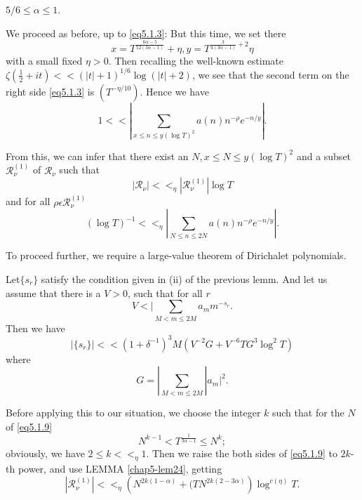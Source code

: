 \begin{Case}\label{chap5-case2}%
  $5/6 \leq \alpha \leq 1$.
\end{Case}

We proceed as before, up to \eqref{eq5.1.3}: But this time, we set
there  
\begin{equation*}
  x = T^{\frac{6 \alpha - 5 }{12(3 \alpha -1)}} + \eta,  y =
  T^{\frac{3 }{4 (3\alpha -1 )}+2}  \eta  \tag{5.1.7} \label{eq5.1.7}
\end{equation*}
with a small fixed $\eta > 0$. Then recalling the well-known estimate
$\zeta (\frac{1}{2} + it) << ( | t | + 1)^{1/6} \log ( | t | + 2)$, we
see that the second term on the right side \eqref{eq5.1.3} is $(T^{-
  \eta/10})$. Hence we have  
$$
1 << | \sum_{x \leq n \leq y (\log T)^2} a (n) n^{-\rho}e^{-n/y} |.
$$

From this, we can infer that there exist an $N, x \leq N \leq y (\log
T)^2$ and a subset $\mathscr{R}^{(1)}_{\nu}$ of $\mathscr{R}_{\nu}$
such that  
\begin{equation*}
  |\mathscr{R}_{\nu} | <<_{\eta} | \mathscr{R}^{(1)}_{\nu} | \log T
  \tag{5.1.8}\label{eq5.1.8} 
\end{equation*}
and for all $\rho \epsilon  \mathscr{R}^{(1)}_{\nu}$
\begin{equation*}
(\log T)^{-1} <<_{\eta} | \sum_{ N \leq n \leq 2N} a (n)
  n^{-\rho}e^{-n/y} |.  \tag{5.1.9} \label{eq5.1.9}
\end{equation*}

To proceed further, we require a large-value theorem of Dirichalet
polynomials. 

\begin{Lemma}\label{chap5-lem24}%
Let\pageoriginale $\{ s_r \}$ satisfy the condition given in (ii) of
the previous lemm. And let us assume that there is a $V > 0$, such
that for all $r$ 
  $$
  V< | \sum_{M < m \leq 2M} a_m m^{-s_r}.
  $$
  Then we have 
  $$
  | \{s_r \} | << (1 + \delta^{-1})^3 M (V^{-2}G + V^{-6}T G^3 \log^2T)
  $$
  where
  $$
  G =| \sum_{M < m \leq 2M} | a_m |^2.
  $$
\end{Lemma}

Before applying this to our situation, we choose the integer $k$ such
that for the $N$ of \eqref{eq5.1.9} 
\begin{equation*}
  N^{k-1} < T^{\frac{1}{3 \alpha -1}} \leq N^k; \tag{5.1.10}\label{eq5.1.10}
\end{equation*}
obviously, we have $2 \leq k <<_{\eta} 1$. Then we raise the both
sides of \eqref{eq5.1.9} to $2k$-th power, and use LEMMA
\ref{chap5-lem24}, getting   
$$
| \mathscr{R}^{(1)}_{\nu} | <<_{\eta} \left(N^{2k(1 - \alpha)}+ (TN^{2k
  (2-3\alpha)}\right) \log^{c(\eta)}T. 
$$

